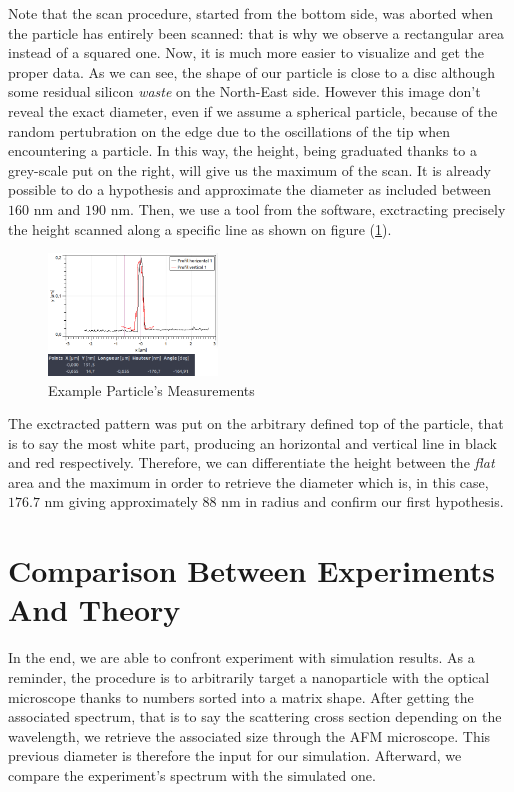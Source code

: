 \documentclass{article}
\numberwithin{equation}{section}
\begin{document}
Note that the scan procedure, started from the bottom side, was aborted when the particle has entirely been scanned: that is why we observe a rectangular area instead of a squared one. Now, it is much more easier to visualize and get the proper data. As we can see, the shape of our particle is close to a disc although some residual silicon \textit{waste} on the North-East side. However this image don't reveal the exact diameter, even if we assume a spherical particle, because of the random pertubration on the edge due to the oscillations of the tip when encountering a particle. In this way, the height, being graduated thanks to a grey-scale put on the right, will give us the maximum of the scan. It is already possible to do a hypothesis and approximate the diameter as included between $160$ nm and $190$ nm. Then, we use a tool from the software, exctracting precisely the height scanned along a specific line as shown on figure (\ref{fig:gwyddion_mesure_ex}).
\begin{figure}[h!]
    \centering
    \includegraphics[width=0.4\textwidth, height=0.32\textwidth]{gwyddion_mesure_ex.png}
    \caption{Example Particle's Measurements}
    \label{fig:gwyddion_mesure_ex}
\end{figure}
The exctracted pattern was put on the arbitrary defined top of the particle, that is to say the most white part, producing an horizontal and vertical line in black and red respectively. Therefore, we can differentiate the height between the \textit{flat} area and the maximum in order to retrieve the diameter which is, in this case, $176.7$ nm giving approximately $88$ nm in radius and confirm our first hypothesis.

\section{Comparison Between Experiments And Theory}

In the end, we are able to confront experiment with simulation results. As a reminder, the procedure is to arbitrarily target a nanoparticle with the optical microscope thanks to numbers sorted into a matrix shape. After getting the associated spectrum, that is to say the scattering cross section depending on the wavelength, we retrieve the associated size through the AFM microscope. This previous diameter is therefore the input for our simulation. Afterward, we compare the experiment's spectrum with the simulated one.
\end{document}
